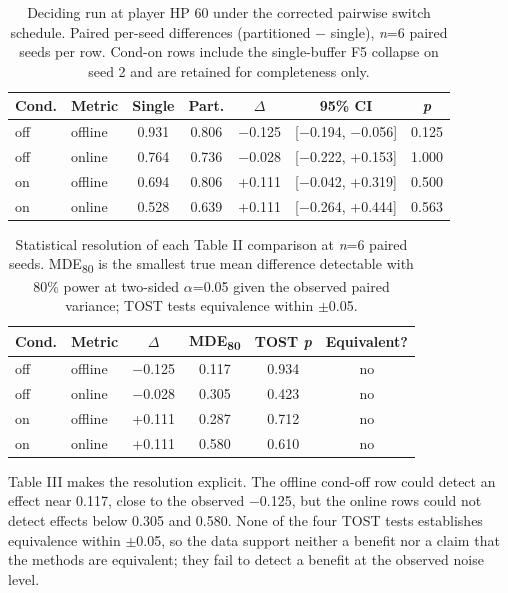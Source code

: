 \documentclass[conference,9pt]{IEEEtran}
\begin{document}
\begin{table}[!t]
\centering
\caption{Deciding run at player HP 60 under the corrected pairwise switch schedule. Paired per-seed differences (partitioned $-$ single), \textit{n}=6 paired seeds per row. Cond-on rows include the single-buffer F5 collapse on seed 2 and are retained for completeness only.}
\scriptsize
\setlength{\tabcolsep}{2pt}
\begin{tabular}{@{}l l c c c c c@{}}
\toprule
\textbf{Cond.} & \textbf{Metric} & \textbf{Single} & \textbf{Part.} & \textbf{$\Delta$} & \textbf{95\% CI} & \textbf{\textit{p}} \\
\midrule
off & offline & 0.931 & 0.806 & $-$0.125 & [$-$0.194, $-$0.056] & 0.125 \\
off & online & 0.764 & 0.736 & $-$0.028 & [$-$0.222, +0.153] & 1.000 \\
on & offline & 0.694 & 0.806 & +0.111 & [$-$0.042, +0.319] & 0.500 \\
on & online & 0.528 & 0.639 & +0.111 & [$-$0.264, +0.444] & 0.563 \\
\bottomrule
\end{tabular}
\end{table}

\begin{table}[!t]
\centering
\caption{Statistical resolution of each Table II comparison at \textit{n}=6 paired seeds. MDE\textsubscript{80} is the smallest true mean difference detectable with 80\% power at two-sided $\alpha$=0.05 given the observed paired variance; TOST tests equivalence within $\pm$0.05.}
\scriptsize
\setlength{\tabcolsep}{2pt}
\begin{tabular}{@{}l l c c c c@{}}
\toprule
\textbf{Cond.} & \textbf{Metric} & \textbf{$\Delta$} & \textbf{MDE\textsubscript{80}} & \textbf{TOST \textit{p}} & \textbf{Equivalent?} \\
\midrule
off & offline & $-$0.125 & 0.117 & 0.934 & no \\
off & online & $-$0.028 & 0.305 & 0.423 & no \\
on & offline & +0.111 & 0.287 & 0.712 & no \\
on & online & +0.111 & 0.580 & 0.610 & no \\
\bottomrule
\end{tabular}
\end{table}

Table III makes the resolution explicit. The offline cond-off row could detect an effect near 0.117, close to the observed $-$0.125, but the online rows could not detect effects below 0.305 and 0.580. None of the four TOST tests establishes equivalence within $\pm$0.05, so the data support neither a benefit nor a claim that the methods are equivalent; they fail to detect a benefit at the observed noise level.
\end{document}
